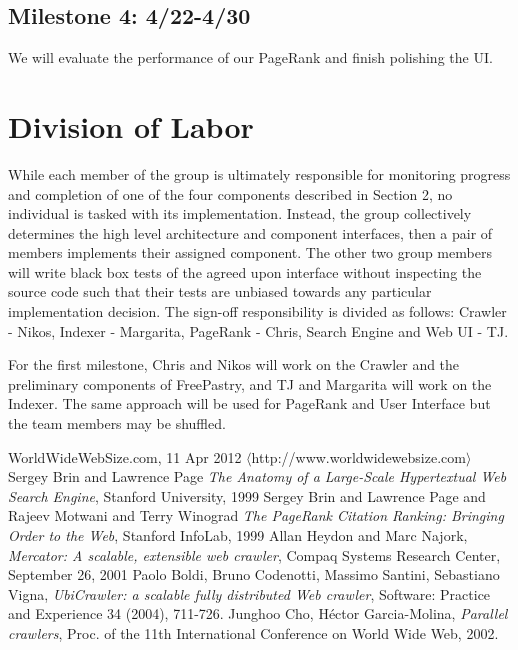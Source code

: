 \documentclass[11pt, letterpaper, oneside, twocolumn]{article}
\begin{document}
\subsection{Milestone 4: 4/22-4/30}
We will evaluate the performance of our PageRank and finish polishing the UI. 


\section{ Division of Labor }
\label{sec:labor}

While each member of the group is ultimately responsible for monitoring progress and completion of one of the four components described in Section 2, no individual is tasked with its implementation.  Instead, the group collectively determines the high level architecture and component interfaces, then a pair of members implements their assigned component.  The other two group members will write black box tests of the agreed upon interface without inspecting the source code such that their tests are unbiased towards any particular implementation decision. The sign-off responsibility is divided as follows: Crawler - Nikos, Indexer - Margarita, PageRank - Chris, Search Engine and Web UI - TJ.

For the first milestone, Chris and Nikos will work on the Crawler and the preliminary components of FreePastry, and TJ and Margarita will work on the Indexer. The same approach will be used for PageRank and User Interface but the team members may be shuffled.

\begin{thebibliography}{9}

   WorldWideWebSize.com, 11 Apr 2012 $\langle$http://www.worldwidewebsize.com$\rangle$
   Sergey Brin and Lawrence Page \emph{The Anatomy of a Large-Scale Hypertextual Web Search Engine}, Stanford University, 1999
   Sergey Brin and  Lawrence Page and Rajeev Motwani and Terry Winograd \emph{The PageRank Citation Ranking: Bringing Order to the Web}, Stanford InfoLab, 1999
   Allan Heydon and Marc Najork, \emph{Mercator: A scalable, extensible web crawler}, Compaq Systems Research Center, September 26, 2001
   Paolo Boldi, Bruno Codenotti, Massimo Santini, Sebastiano Vigna, \emph{UbiCrawler: a scalable fully distributed Web crawler}, Software: Practice and Experience 34 (2004), 711-726.
   Junghoo Cho, Héctor Garcia-Molina, \emph{Parallel crawlers}, Proc. of the 11th International Conference on World Wide Web, 2002.


\end{thebibliography}
\end{document}
